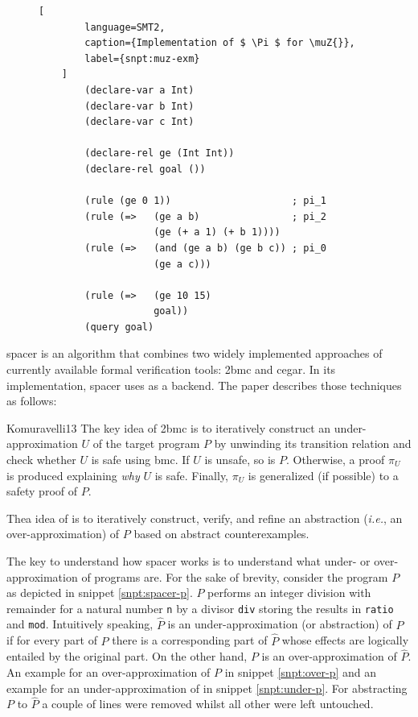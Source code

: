 \begin{figure}
    \begin{lstlisting}[
        language=SMT2,
        caption={Implementation of $ \Pi $ for \muZ{}},
        label={snpt:muz-exm}
    ]
        (declare-var a Int)
        (declare-var b Int)
        (declare-var c Int)

        (declare-rel ge (Int Int))
        (declare-rel goal ())

        (rule (ge 0 1))                     ; pi_1
        (rule (=>   (ge a b)                ; pi_2
                    (ge (+ a 1) (+ b 1))))
        (rule (=>   (and (ge a b) (ge b c)) ; pi_0
                    (ge a c)))

        (rule (=>   (ge 10 15)
                    goal))
        (query goal)
    \end{lstlisting}
\end{figure}

\gls{spacer} \cite{Komuravelli13} is an algorithm that combines two widely implemented approaches of currently available formal verification tools: \gls{2bmc} and \gls{cegar}.
In its implementation, \gls{spacer} uses \muZ{} as a backend.
The paper describes those techniques as follows:
\begin{displaycquote}[p.1f]{Komuravelli13}
    The key idea of \gls{2bmc} is to iteratively construct an under-approximation  $ U $ of the target program $ P $ by unwinding its transition relation and check whether $ U $ is safe using \gls{bmc}.
    If $ U $ is unsafe, so is $ P $.
    Otherwise, a proof $ \pi_U $ is produced explaining \textit{why} $ U $ is safe.
    Finally, $ \pi_U $ is generalized (if possible) to a safety proof of $ P $.
    \textelp{}

    Thea idea of  is to iteratively construct, verify, and refine an abstraction (\textit{i.e.}, an over-approximation) of $ P $ based on abstract counterexamples.
\end{displaycquote}

The key to understand how \gls{spacer} works is to understand what under- or over-approximation of programs are.
For the sake of brevity, consider the program $ P $ as depicted in snippet \ref{snpt:spacer-p}.
$ P $ performs an integer division with remainder for a natural number \lstinline{n} by a divisor \lstinline{div} storing the results in \lstinline{ratio} and \lstinline{mod}.
Intuitively speaking, $ \hat{P} $ is an under-approximation (or abstraction) of $ P $ if for every part of $ P $ there is a corresponding part of $ \hat{P} $ whose effects are logically entailed by the original part.
On the other hand, $ P $ is an over-approximation of $ \hat{P} $.
An example for an over-approximation of $ P $ in snippet \ref{snpt:over-p} and an example for an under-approximation of in snippet \ref{snpt:under-p}.
For abstracting $ P $ to $ \hat{P} $ a couple of lines were removed whilst all other were left untouched.

